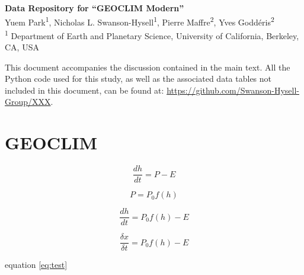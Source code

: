 \documentclass[11pt,letterpaper]{article}
\begin{document}
\begin{flushleft}
{\Large \textbf{Data Repository for ``GEOCLIM Modern''}}
\\
Yuem Park\textsuperscript{1},
Nicholas L. Swanson-Hysell\textsuperscript{1},
Pierre Maffre\textsuperscript{2},
Yves Godd\'eris\textsuperscript{2}
\\
\bigskip
\textsuperscript{1} Department of Earth and Planetary Science, University of California, Berkeley, CA, USA
\\
\bigskip

\end{flushleft}

\linenumbers

This document accompanies the discussion contained in the main text. All the Python code used for this study, as well as the associated data tables not included in this document, can be found at: \url{https://github.com/Swanson-Hysell-Group/XXX}.

\section*{GEOCLIM}

\begin{equation}
    \frac{dh}{dt} = P - E
\end{equation}

\begin{equation}
    P = P_{0}f(h)
\end{equation}

\begin{equation}
    \frac{dh}{dt} = P_{0}f(h) - E
\end{equation}

\begin{equation}
    \frac{\delta x}{\delta t} = P_{0}f(h) - E
\end{equation}

equation \ref{eq:test}

\clearpage

\singlespacing

\newpage



\end{document}

